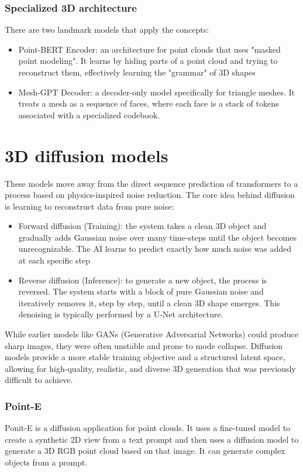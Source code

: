 \subsubsection{Specialized 3D architecture}
There are two landmark models that apply the concepts:
\begin{itemize}[noitemsep]
    \item Point-BERT Encoder: an architecture for point clouds that uses "masked point modeling". It learns by hiding parts of a point cloud and trying to reconstruct them, effectively learning the "grammar" of 3D shapes
    \item Mesh-GPT Decoder: a decoder-only model specifically for triangle meshes. It treats a mesh as a sequence of faces, where each face is a stack of tokens associated with a specialized codebook.
\end{itemize}

\section{3D diffusion models}
These models move away from the direct sequence prediction of transformers to a process based on physics-inspired noise reduction. The core idea behind diffusion is learning to reconstruct data from pure noise:
\begin{itemize}[noitemsep]
    \item Forward diffusion (Training): the system takes a clean 3D object and gradually adds Gaussian noise over many time-steps until the object becomes unrecognizable. The AI learns to predict exactly how much noise was added at each specific step
    \item Reverse diffusion (Inference): to generate a new object, the process is reversed. The system starts with a block of pure Gaussian noise and iteratively removes it, step by step, until a clean 3D shape emerges. This denoising is typically performed by a U-Net architecture.
\end{itemize}

While earlier models like GANs (Generative Adversarial Networks) could produce sharp images, they were often unstable and prone to mode collapse. Diffusion models provide a more stable training objective and a structured latent space, allowing for high-quality, realistic, and diverse 3D generation that was previously difficult to achieve.

\subsubsection{Point-E}
Ponit-E is a diffusion application for point clouds. It uses a fine-tuned model to create a synthetic 2D view from a text prompt and then uses a diffusion model to generate a 3D RGB point cloud based on that image. It can generate complex objects from a prompt.

